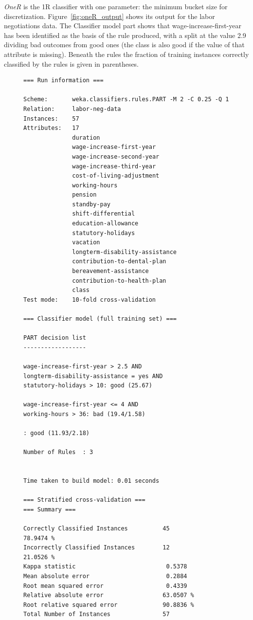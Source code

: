 \textit{OneR} is the 1R classifier with one parameter: the minimum
bucket size for discretization. Figure~\ref{fig:oneR_output} shows its
output for the labor negotiations data. The Classifier model part
shows that wage-increase-first-year has been identified as the basis
of the rule produced, with a split at the value 2.9 dividing bad
outcomes from good ones (the class is also good if the value of that
attribute is missing). Beneath the rules the fraction of training
instances correctly classified by the rules is given in parentheses.

\begin{figure}[!p]
\begin{mdframed}[innermargin=-1.5cm]
\begin{Verbatim}[fontsize=\scriptsize]
=== Run information ===

Scheme:       weka.classifiers.rules.PART -M 2 -C 0.25 -Q 1
Relation:     labor-neg-data
Instances:    57
Attributes:   17
              duration
              wage-increase-first-year
              wage-increase-second-year
              wage-increase-third-year
              cost-of-living-adjustment
              working-hours
              pension
              standby-pay
              shift-differential
              education-allowance
              statutory-holidays
              vacation
              longterm-disability-assistance
              contribution-to-dental-plan
              bereavement-assistance
              contribution-to-health-plan
              class
Test mode:    10-fold cross-validation

=== Classifier model (full training set) ===

PART decision list
------------------

wage-increase-first-year > 2.5 AND
longterm-disability-assistance = yes AND
statutory-holidays > 10: good (25.67)

wage-increase-first-year <= 4 AND
working-hours > 36: bad (19.4/1.58)

: good (11.93/2.18)

Number of Rules  : 3


Time taken to build model: 0.01 seconds

=== Stratified cross-validation ===
=== Summary ===

Correctly Classified Instances          45               78.9474 %
Incorrectly Classified Instances        12               21.0526 %
Kappa statistic                          0.5378
Mean absolute error                      0.2884
Root mean squared error                  0.4339
Relative absolute error                 63.0507 %
Root relative squared error             90.8836 %
Total Number of Instances               57     


\end{Verbatim}
\end{mdframed}
\end{figure}
